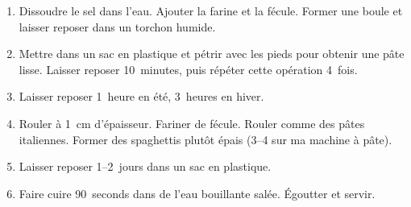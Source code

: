 \label{拉麺}

\begin{ingredients}
\end{ingredients}


\begin{recipe}
  \begin{enumerate}

  \item Dissoudre le sel dans l'eau.  Ajouter la farine et la fécule.
    Former une boule et laisser reposer dans un torchon humide.

  \item Mettre dans un sac en plastique et pétrir avec les pieds pour
    obtenir une pâte lisse.  Laisser reposer 10~minutes, puis répéter
    cette opération 4~fois.

  \item Laisser reposer 1~heure en été, 3~heures en hiver.

  \item Rouler à 1~cm d'épaisseur.  Fariner de fécule.  Rouler comme
    des pâtes italiennes.  Former des spaghettis plutôt épais (3--4
    sur ma machine à pâte).

  \item Laisser reposer 1--2~jours dans un sac en plastique.

  \item Faire cuire 90~seconds dans de l'eau bouillante salée.
    Égoutter et servir.

  \end{enumerate}
\end{recipe}

